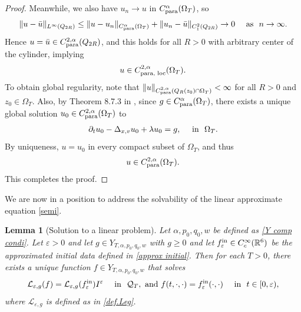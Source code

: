 \documentclass[reqno,11pt,final]{amsart}
\theoremstyle{plain}
\newtheorem{lemma}[theorem]{Lemma}
\numberwithin{equation}{section}
\numberwithin{theorem}{section}
\begin{document}
\begin{proof}
Meanwhile, we also have $u_n\to u$ in $C^\alpha_\textup{para}(\Omega_T)$, so
\begin{align*}
\| u-\bar{u}\|_{L^\infty(Q_{2R})} \le \|u-u_n\|_{C^\alpha_\textup{para}(\Omega_T)} + \|u_n - \bar{u}\|_{C^{2}_1(Q_{2R})} \to0 \quad \textup{ as }\,\,n\to\infty.
\end{align*}Hence $u=\bar{u}\in C^{2,\alpha}_\textup{para}(Q_{2R})$, and this holds for all $R>0$ with arbitrary center of the cylinder, implying
\begin{align*}
u\in C^{2,\alpha}_{\textup{para, loc}}(\Omega_T).
\end{align*}To obtain global regularity, note that $\| u\|_{C^{2,\alpha}_\textup{para}(Q_R(z_0)\cap \Omega_T)}<\infty$ for all $R>0$ and $z_0\in\Omega_T$. Also, by Theorem 8.7.3 in \cite{Ell_Krylov_1996}, since $g\in C^\alpha_\textup{para}(\Omega_T)$, there exists a unique global solution $u_0\in C^{2,\alpha}_\textup{para}(\Omega_T)$ to
\begin{align*}
\partial_tu_0 - \Delta_{x,v}u_0+\lambda u_0 = g, \quad \textup{ in }\,\,\Omega_T.
\end{align*}By uniqueness, $u=u_0$ in every compact subset of $\Omega_T$, and thus
\begin{align*}
u\in C^{2,\alpha}_\textup{para}(\Omega_T).
\end{align*}This completes the proof.
\end{proof}


We are now in a position to address the solvability of the linear approximate equation \eqref{semi}.
\begin{lemma}[Solution to a linear problem] \label{Linear existence}Let $\alpha,p_0,q_0,w$ be defined as \eqref{Y comp condi}. Let $\varepsilon>0$ and let $g\in Y_{T,\alpha,p_0,q_0,w}$ with $g\ge0$ and let $f^\textup{in}_\varepsilon\in C^\infty_c(\mathbb{R}^6)$ be the approximated initial data defined in \eqref{approx initial}. Then for each $T>0$, there exists a unique function $f\in Y_{T,\alpha,p_0,q_0,w}$ that solves
\begin{align}\label{semi problem}
\mathcal{L}_{\varepsilon,g}(f) = \mathcal{L}_{\varepsilon,g}(f^\textup{in}_\varepsilon)I^\varepsilon \quad \textup{ in }\,\, \mathcal{Q}_T,\textup{ and }f(t,\cdot,\cdot) = f^\textup{in}_\varepsilon(\cdot,\cdot) \quad \textup{ in }\,\, t\in[0,\varepsilon),
\end{align} where $\mathcal{L}_{\varepsilon,g}$ is defined as in \eqref{def.Leg}.
\end{lemma}
\end{document}
